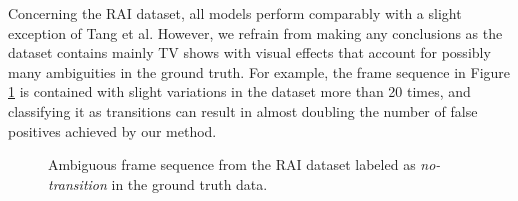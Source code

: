 Concerning the RAI dataset, all models perform comparably with a slight exception of Tang et al. However, we refrain from making any conclusions as the dataset contains mainly TV shows with visual effects that account for possibly many ambiguities in the ground truth. For example, the frame sequence in Figure \ref{fig:ambiguous_sequence_rai} is contained with slight variations in the dataset more than 20 times, and classifying it as transitions can result in almost doubling the number of false positives achieved by our method.

\begin{figure}[h]
    \centering
    \caption[Ambiguous frame sequence from the RAI dataset]{Ambiguous frame sequence from the RAI dataset labeled as \textit{no-transition} in the ground truth data.}
    \label{fig:ambiguous_sequence_rai}
\end{figure}


